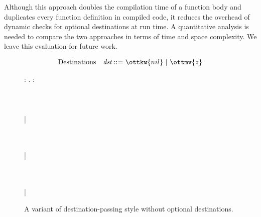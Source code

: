 Although this approach doubles the compilation time of a function body and
duplicates every function definition in compiled code, it reduces the overhead
of dynamic checks for optional destinations at run time. A quantitative analysis
is needed to compare the two approaches in terms of time and space complexity.
We leave this evaluation for future work.

\begin{figure}
\small
\begin{align*}
  &\text{Destinations}&\textit{dst} ::=&~ \ottkw{nil} ~|~ \ottmv{z} \\
\end{align*}
\begin{ottdefnblock}{\compilation}{}
  {\Gamma  \ottsym{;}    \vdash   \lambda {} \!:\!  .\;  \!:\!   \, \Rightarrow \,   \rightarrow  {}  \, \rightsquigarrow \\\\
    \\\\
     \; | \;  }
\end{ottdefnblock}
\begin{ottdefnblock}{\application}{}
  {\Gamma  \ottsym{;}    \vdash  {}  \ottsym{:}    \rightarrow  {}  \, \bullet \,    \ottsym{:}    \, \rightsquigarrow \\\\
     \; | \;    \ottsym{:}  }

  {\Gamma  \ottsym{;}    \vdash  {}  \ottsym{:}    \rightarrow  {}  \, \bullet \,    \ottsym{:}    \, \rightsquigarrow \\\\
     \; | \;    \ottsym{:}  }
\end{ottdefnblock}
\caption{A variant of destination-passing style without optional destinations.} \label{fig:dst-nodst}
\end{figure}

